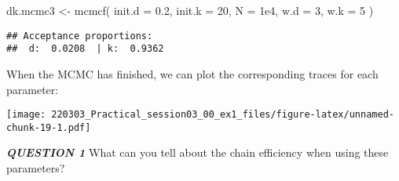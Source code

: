 \documentclass[
]{article}
\newenvironment{Shaded}{\begin{snugshade}}{\end{snugshade}}
\newcommand{\AttributeTok}[1]{\textcolor[rgb]{0.77,0.63,0.00}{#1}}
\newcommand{\CommentTok}[1]{\textcolor[rgb]{0.56,0.35,0.01}{\textit{#1}}}
\newcommand{\DecValTok}[1]{\textcolor[rgb]{0.00,0.00,0.81}{#1}}
\newcommand{\FloatTok}[1]{\textcolor[rgb]{0.00,0.00,0.81}{#1}}
\newcommand{\FunctionTok}[1]{\textcolor[rgb]{0.00,0.00,0.00}{#1}}
\newcommand{\NormalTok}[1]{#1}
\newcommand{\OtherTok}[1]{\textcolor[rgb]{0.56,0.35,0.01}{#1}}
\newcommand{\SpecialCharTok}[1]{\textcolor[rgb]{0.00,0.00,0.00}{#1}}
\newcommand{\StringTok}[1]{\textcolor[rgb]{0.31,0.60,0.02}{#1}}
\begin{document}
\begin{Shaded}
\begin{Highlighting}[]
\NormalTok{dk.mcmc3 }\OtherTok{\textless{}{-}} \FunctionTok{mcmcf}\NormalTok{( }\AttributeTok{init.d =} \FloatTok{0.2}\NormalTok{, }\AttributeTok{init.k =} \DecValTok{20}\NormalTok{, }\AttributeTok{N =} \FloatTok{1e4}\NormalTok{,}
                   \AttributeTok{w.d =} \DecValTok{3}\NormalTok{, }\AttributeTok{w.k =} \DecValTok{5}\NormalTok{ )}
\end{Highlighting}
\end{Shaded}

\begin{verbatim}
## Acceptance proportions:
##  d:  0.0208  | k:  0.9362
\end{verbatim}

When the MCMC has finished, we can plot the corresponding traces for
each parameter:

\begin{Shaded}
\end{Shaded}

\texttt{[image: 220303\_Practical\_session03\_00\_ex1\_files/figure-latex/unnamed-chunk-19-1.pdf]}

\emph{\textbf{QUESTION 1}} What can you tell about the chain efficiency
when using these parameters?
\end{document}
